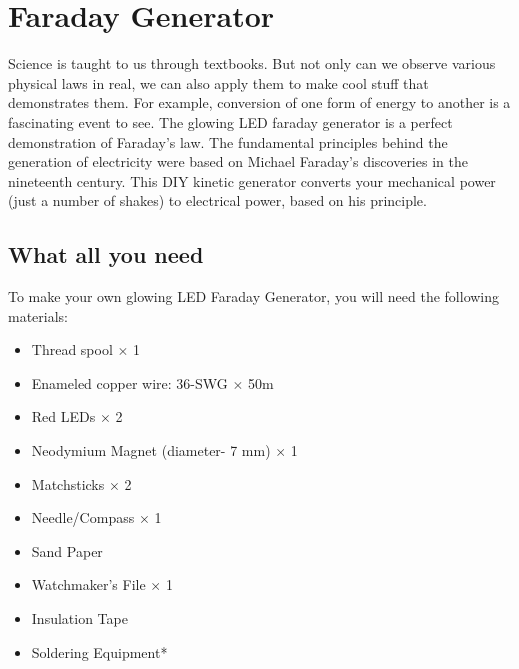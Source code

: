 \cleardoublepage
{} %

\chapter{Faraday Generator}
Science is taught to us through textbooks. But not only can we observe
various physical laws in real, we can also apply them to make cool stuff
that demonstrates them. For example, conversion of one form of energy to
another is a fascinating event to see. The glowing LED faraday generator is a
perfect demonstration of Faraday’s law. The fundamental principles behind
the generation of electricity were based on Michael Faraday’s discoveries in
the nineteenth century. This DIY kinetic generator converts your mechanical
power (just a number of shakes) to electrical power, based on his principle.

\section{What all you need}
To make your own glowing LED Faraday Generator, you will need the
following materials:
\begin{itemize}
    \item Thread spool $\times$ 1
    \item Enameled copper wire: 36-SWG $\times$ 50m
    \item Red LEDs $\times$ 2
    \item Neodymium Magnet (diameter- 7 mm) $\times$ 1
    \item Matchsticks $\times$ 2
    \item Needle/Compass $\times$ 1
    \item Sand Paper
    \item Watchmaker’s File $\times$ 1
    \item Insulation Tape
    \item Soldering Equipment*
\end{itemize}

